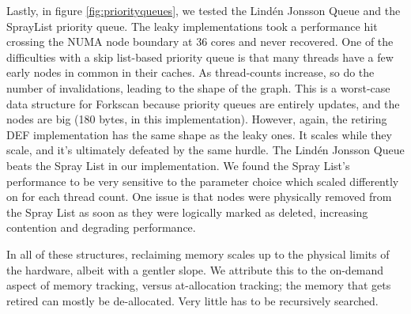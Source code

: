 Lastly, in figure \ref{fig:priorityqueues}, we tested the Lind{\'e}n Jonsson Queue and the SprayList priority queue.  The leaky implementations took a performance hit crossing the NUMA node boundary at 36 cores and never recovered.  One of the difficulties with a skip list-based priority queue is that many threads have a few early nodes in common in their caches.  As thread-counts increase, so do the number of invalidations, leading to the shape of the graph.  This is a worst-case data structure for Forkscan because priority queues are entirely updates, and the nodes are big (180 bytes, in this implementation).  However, again, the retiring DEF implementation has the same shape as the leaky ones.  It scales while they scale, and it's ultimately defeated by the same hurdle. The Lind{\'e}n Jonsson Queue beats the Spray List in our implementation. We found the Spray List's performance to be very sensitive to the parameter choice which scaled differently on for each thread count. One issue is that nodes were physically removed from the Spray List as soon as they were logically marked as deleted, increasing contention and degrading performance. 

In all of these structures, reclaiming memory scales up to the physical limits of the hardware, albeit with a gentler slope.  We attribute this to the on-demand aspect of memory tracking, versus at-allocation tracking; the memory that gets retired can mostly be de-allocated. Very little has to be recursively searched.

